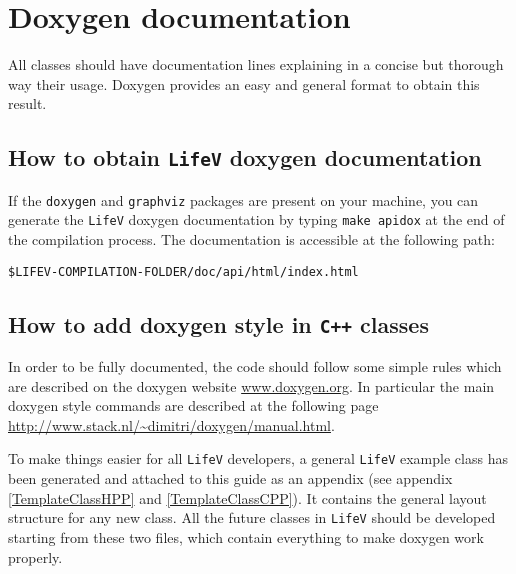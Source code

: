 \documentclass[10p]{article}
\begin{document}
\section{Doxygen documentation} \label{doxygen}
All classes should have documentation lines explaining in a concise but thorough way their usage. Doxygen provides an easy and general format to obtain this result.

\subsection{How to obtain \texttt{LifeV} doxygen documentation} If the \texttt{doxygen} and \texttt{graphviz} packages are present on your machine, you can generate the \texttt{LifeV} doxygen documentation by typing \texttt{make apidox} at the end of the compilation process. The documentation is accessible at the following path: \newline

\texttt{\$LIFEV-COMPILATION-FOLDER/doc/api/html/index.html}\newline

\subsection{How to add doxygen style in \texttt{C++} classes}
In order to be fully documented, the code should follow some simple rules which are described on the doxygen website \url{www.doxygen.org}. In particular the main doxygen style commands are described at the following page \url{http://www.stack.nl/~dimitri/doxygen/manual.html}.

To make things easier for all \texttt{LifeV} developers, a general \texttt{LifeV} example class has been generated and attached to this guide as an appendix (see appendix \ref{TemplateClassHPP} and \ref{TemplateClassCPP}). It contains the general layout structure for any new class. All the future classes in \texttt{LifeV} should be developed starting from these two files, which contain everything to make doxygen work properly.
\end{document}
